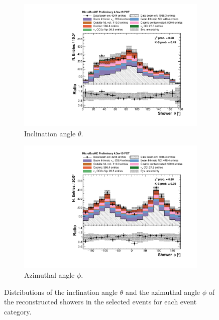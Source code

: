 \begin{figure}[htbp]
\centering
  \begin{subfigure}{0.49\textwidth}
    \includegraphics[width=\linewidth]{figures/h_shower_theta.pdf}
    \caption{Inclination angle $\theta$.} 
  \end{subfigure}\hfill
    \begin{subfigure}{0.49\textwidth}
    \includegraphics[width=\linewidth]{figures/h_shower_phi.pdf}
    \caption{Azimuthal angle $\phi$.} 
  \end{subfigure}
  \caption{Distributions of the inclination angle $\theta$ and the azimuthal angle $\phi$ of the reconstructed showers in the selected events for each event category.}\label{fig:thetaphi}
\end{figure}

